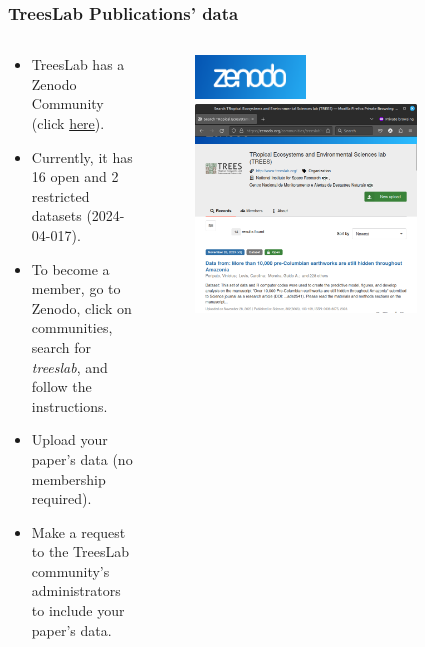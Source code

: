 \documentclass[aspectratio=169]{beamer}
\begin{document}
\begin{frame}
    \frametitle{TreesLab Publications' data}
    \begin{columns}
        \begin{column}{0.5\textwidth}
            \begin{itemize}
                \item TreesLab has a Zenodo Community (click 
            \href{https://zenodo.org/communities/treeslab}{here}).
        \item Currently, it has 16 open and 2 restricted datasets 
            (2024-04-017).
                \item To become a member, go to Zenodo, click on communities, 
                    search for \emph{treeslab}, and follow the instructions.
                \item Upload your paper's data (no membership required). 
                \item Make a request to the TreesLab community's administrators 
                    to include your paper's data.
            \end{itemize} 
        \end{column}
        \begin{column}{0.5\textwidth}
            \begin{figure}
                \centering
                \includegraphics[width=0.4\textwidth]{logos/zenodo.png}
                \includegraphics[width=0.8\textwidth]{img/zenodo_treeslab.png}
            \end{figure}
        \end{column}
    \end{columns}
\end{frame}
\end{document}
